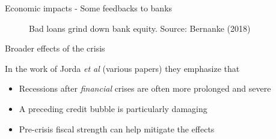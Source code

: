 

\begin{frame}{Economic impacts - Some feedbacks to banks}

\begin{figure}
\begin{center}


\caption{Bad loans grind down bank equity. Source: Bernanke (2018)}

\end{center}
\end{figure}

\end{frame}



\begin{frame}{Broader effects of the crisis}

In the work of Jorda \emph{et al} (various papers) they emphasize that
	\begin{itemize}
	\item	Recessions after \textit{financial} crises are often more prolonged and severe
	\item	A preceding credit bubble is particularly damaging
	\item	Pre-crisis fiscal strength can help mitigate the effects
	\end{itemize}

\end{frame}

